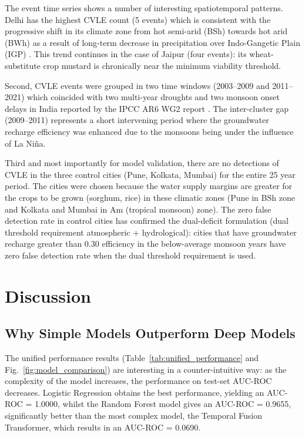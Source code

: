 \documentclass{ieeeaccess}
\begin{document}
The event time series shows a number of interesting spatiotemporal patterns. Delhi has the highest CVLE count (5 events) which is consistent with the progressive shift in its climate zone from hot semi-arid (BSh) towards hot arid (BWh) as a result of long-term decrease in precipitation over Indo-Gangetic Plain (IGP) \cite{rodell2009}. This trend continues in the case of Jaipur (four events): its wheat-substitute crop mustard is chronically near the minimum viability threshold.

Second, CVLE events were grouped in two time windows (2003–2009 and 2011–2021) which coincided with two multi-year droughts and two monsoon onset delays in India reported by the IPCC AR6 WG2 report \cite{ipccar6wg2}. The inter-cluster gap (2009--2011) represents a short intervening period where the groundwater recharge efficiency was enhanced due to the monsoons being under the influence of La Niña.

Third and most importantly for model validation, there are no detections of CVLE in the three control cities (Pune, Kolkata, Mumbai) for the entire 25 year period. The cities were chosen because the water supply margins are greater for the crops to be grown (sorghum, rice) in these climatic zones (Pune in BSh zone and Kolkata and Mumbai in Am (tropical monsoon) zone). The zero false detection rate in control cities has confirmed the dual-deficit formulation (dual threshold requirement atmospheric + hydrological): cities that have groundwater recharge greater than 0.30 efficiency in the below-average monsoon years have zero false detection rate when the dual threshold requirement is used.

\section{Discussion}
\label{sec:discussion}

\subsection{Why Simple Models Outperform Deep Models}

The unified performance results (Table~\ref{tab:unified_performance} and Fig.~\ref{fig:model_comparison}) are interesting in a counter-intuitive way: as the complexity of the model increases, the performance on test-set AUC-ROC decreases. Logistic Regression obtains the best performance, yielding an AUC-ROC = 1.0000, whilst the Random Forest model gives an AUC-ROC = 0.9655, significantly better than the most complex model, the Temporal Fusion Transformer, which results in an AUC-ROC = 0.0690.
\end{document}
